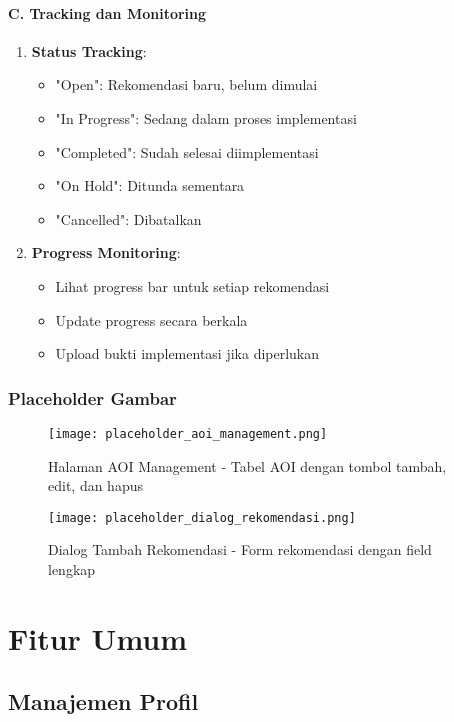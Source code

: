 \documentclass[12pt,a4paper]{article}
\begin{document}
\paragraph{C. Tracking dan Monitoring}
\begin{enumerate}
\item \textbf{Status Tracking}:
\begin{itemize}
\item "Open": Rekomendasi baru, belum dimulai
\item "In Progress": Sedang dalam proses implementasi
\item "Completed": Sudah selesai diimplementasi
\item "On Hold": Ditunda sementara
\item "Cancelled": Dibatalkan
\end{itemize}
\item \textbf{Progress Monitoring}:
\begin{itemize}
\item Lihat progress bar untuk setiap rekomendasi
\item Update progress secara berkala
\item Upload bukti implementasi jika diperlukan
\end{itemize}
\end{enumerate}

\subsubsection{Placeholder Gambar}
\begin{figure}[H]
\centering
\texttt{[image: placeholder\_aoi\_management.png]}
\caption{Halaman AOI Management - Tabel AOI dengan tombol tambah, edit, dan hapus}
\label{fig:aoi_management}
\end{figure}

\begin{figure}[H]
\centering
\texttt{[image: placeholder\_dialog\_rekomendasi.png]}
\caption{Dialog Tambah Rekomendasi - Form rekomendasi dengan field lengkap}
\label{fig:dialog_rekomendasi}
\end{figure}

\section{Fitur Umum}

\subsection{Manajemen Profil}
\end{document}
